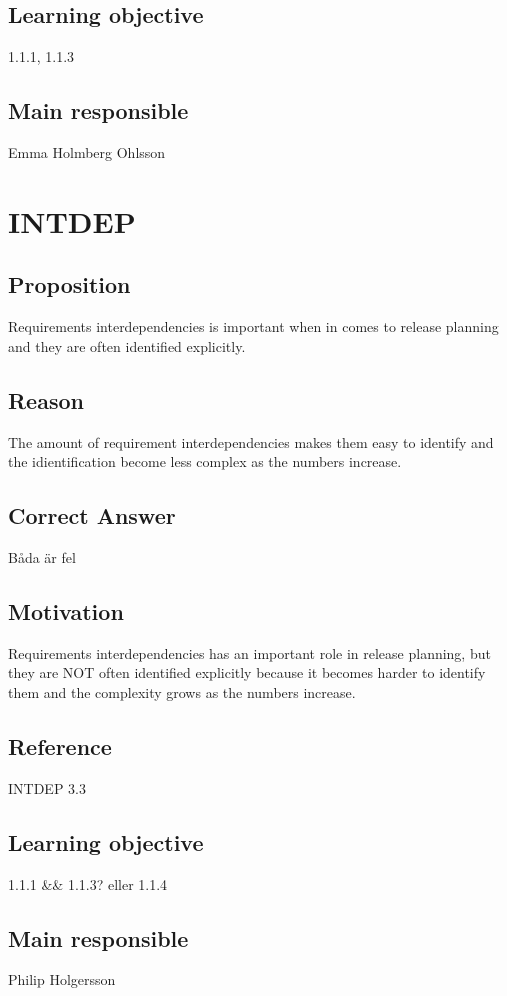\documentclass[a4paper]{article}
\begin{document}
\subsection*{Learning objective}
1.1.1, 1.1.3
\subsection*{Main responsible}
Emma Holmberg Ohlsson




\section{INTDEP}
\subsection*{Proposition}
Requirements interdependencies is important when in comes to release planning and they are often identified explicitly.
\subsection*{Reason}
The amount of requirement interdependencies makes them easy to identify and the idientification become less complex as the numbers increase.
\subsection*{Correct Answer}
Båda är fel
\subsection*{Motivation}
Requirements interdependencies has an important role in release planning, but they are NOT often identified explicitly because it becomes harder to identify them and the complexity grows as the numbers increase.
\subsection*{Reference}
INTDEP 3.3
\subsection*{Learning objective}
1.1.1 \&\& 1.1.3? eller 1.1.4
\subsection*{Main responsible}
Philip Holgersson
\end{document}
